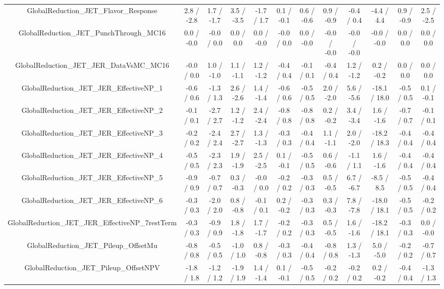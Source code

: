 \begin{table}[htbp]
\begin{center}
\begin{tabular}{|c|c|c|c|c|c|c|c|c|c|c|c|}
  GlobalReduction_JET_Flavor_Response & 2.8 / -2.8 & 1.7 / -1.7 & 3.5 / -3.5 & -1.7 / 1.7 & 0.1 / -0.1 & 0.6 / -0.6 & 0.9 / -0.9 & -0.4 / 0.4 & -4.4 / 4.4 & 0.9 / -0.9 & 2.5 / -2.5 \\ 
  GlobalReduction_JET_PunchThrough_MC16 & 0.0 / -0.0 & -0.0 / 0.0 & 0.0 / 0.0 & 0.0 / -0.0 & -0.0 / 0.0 & 0.0 / -0.0 & -0.0 / -0.0 & -0.0 / -0.0 & -0.0 / -0.0 & 0.0 / 0.0 & 0.0 / 0.0 \\ 
  GlobalReduction_JET_JER_DataVsMC_MC16 & -0.0 / 0.0 & 1.0 / -1.0 & 1.1 / -1.1 & 1.2 / -1.2 & -0.4 / 0.4 & -0.1 / 0.1 & -0.4 / 0.4 & 1.2 / -1.2 & 0.2 / -0.2 & 0.0 / 0.0 & 0.0 / 0.0 \\ 
  GlobalReduction_JET_JER_EffectiveNP_1 & -0.6 / 0.6 & -1.3 / 1.3 & 2.6 / -2.6 & 1.4 / -1.4 & -0.6 / 0.6 & -0.5 / 0.5 & 2.0 / -2.0 & 5.6 / -5.6 & -18.1 / 18.0 & -0.5 / 0.5 & 0.1 / -0.1 \\ 
  GlobalReduction_JET_JER_EffectiveNP_2 & -0.1 / 0.1 & -2.7 / 2.7 & 1.2 / -1.2 & 2.4 / -2.4 & -0.8 / 0.8 & -0.8 / 0.8 & 0.2 / -0.2 & 3.4 / -3.4 & 1.6 / -1.6 & -0.7 / 0.7 & -0.1 / 0.1 \\ 
  GlobalReduction_JET_JER_EffectiveNP_3 & -0.2 / 0.2 & -2.4 / 2.4 & 2.7 / -2.7 & 1.3 / -1.3 & -0.3 / 0.3 & -0.4 / 0.4 & 1.1 / -1.1 & 2.0 / -2.0 & -18.2 / 18.3 & -0.4 / 0.4 & -0.4 / 0.4 \\ 
  GlobalReduction_JET_JER_EffectiveNP_4 & -0.5 / 0.5 & -2.3 / 2.3 & 1.9 / -1.9 & 2.5 / -2.5 & 0.1 / -0.1 & -0.5 / 0.5 & 0.6 / -0.6 & -1.1 / 1.1 & 1.6 / -1.6 & -0.4 / 0.4 & -0.4 / 0.4 \\ 
  GlobalReduction_JET_JER_EffectiveNP_5 & -0.9 / 0.9 & -0.7 / 0.7 & 0.3 / -0.3 & -0.0 / 0.0 & -0.2 / 0.2 & -0.3 / 0.3 & 0.5 / -0.5 & 6.7 / -6.7 & -8.5 / 8.5 & -0.5 / 0.5 & -0.4 / 0.4 \\ 
  GlobalReduction_JET_JER_EffectiveNP_6 & -0.3 / 0.3 & -2.0 / 2.0 & 0.8 / -0.8 & -0.1 / 0.1 & 0.2 / -0.2 & -0.3 / 0.3 & 0.3 / -0.3 & 7.8 / -7.8 & -18.0 / 18.1 & -0.5 / 0.5 & -0.2 / 0.2 \\ 
  GlobalReduction_JET_JER_EffectiveNP_7restTerm & -0.3 / 0.3 & -0.9 / 0.9 & 1.8 / -1.8 & 1.7 / -1.7 & -0.2 / 0.2 & -0.3 / 0.3 & 0.5 / -0.5 & 1.6 / -1.6 & -18.2 / 18.1 & -0.3 / 0.3 & 0.0 / -0.0 \\ 
  GlobalReduction_JET_Pileup_OffsetMu & -0.8 / 0.8 & -0.5 / 0.5 & -1.0 / 1.0 & 0.8 / -0.8 & -0.3 / 0.3 & -0.4 / 0.4 & -0.8 / 0.8 & 1.3 / -1.3 & 5.0 / -5.0 & -0.2 / 0.2 & -0.7 / 0.7 \\ 
  GlobalReduction_JET_Pileup_OffsetNPV & -1.8 / 1.8 & -1.2 / 1.2 & -1.9 / 1.9 & 1.4 / -1.4 & 0.1 / -0.1 & -0.5 / 0.5 & -0.2 / 0.2 & -0.2 / 0.2 & 0.2 / -0.2 & -0.4 / 0.4 & -1.3 / 1.3 \\ 

\end{tabular}
\end{center}
\end{table}
